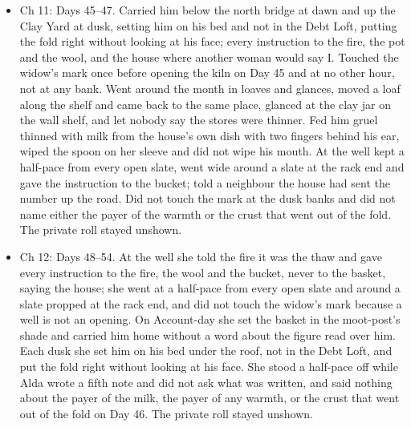 \documentclass{design/chronicle}
\begin{document}
{\begin{itemize}[leftmargin=1.4em,itemsep=1pt,topsep=3pt,parsep=0pt]
\end{itemize}

\begin{itemize}[leftmargin=1.4em,itemsep=1pt,topsep=3pt,parsep=0pt]

\item Ch 11: Days 45–47. Carried him below the north bridge at dawn and up the Clay Yard at dusk, setting him on his bed and not in the Debt Loft, putting the fold right without looking at his face; every instruction to the fire, the pot and the wool, and the house where another woman would say I. Touched the widow’s mark once before opening the kiln on Day 45 and at no other hour, not at any bank. Went around the month in loaves and glances, moved a loaf along the shelf and came back to the same place, glanced at the clay jar on the wall shelf, and let nobody say the stores were thinner. Fed him gruel thinned with milk from the house’s own dish with two fingers behind his ear, wiped the spoon on her sleeve and did not wipe his mouth. At the well kept a half-pace from every open slate, went wide around a slate at the rack end and gave the instruction to the bucket; told a neighbour the house had sent the number up the road. Did not touch the mark at the dusk banks and did not name either the payer of the warmth or the crust that went out of the fold. The private roll stayed unshown.

\end{itemize}

\begin{itemize}[leftmargin=1.4em,itemsep=1pt,topsep=3pt,parsep=0pt]

\item Ch 12: Days 48–54. At the well she told the fire it was the thaw and gave every instruction to the fire, the wool and the bucket, never to the basket, saying the house; she went at a half-pace from every open slate and around a slate propped at the rack end, and did not touch the widow’s mark because a well is not an opening. On Account-day she set the basket in the moot-post’s shade and carried him home without a word about the figure read over him. Each dusk she set him on his bed under the roof, not in the Debt Loft, and put the fold right without looking at his face. She stood a half-pace off while Alda wrote a fifth note and did not ask what was written, and said nothing about the payer of the milk, the payer of any warmth, or the crust that went out of the fold on Day 46. The private roll stayed unshown.

\end{itemize}

}
\end{document}
